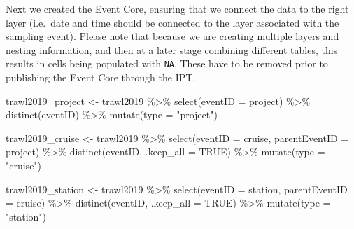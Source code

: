 \documentclass[
]{book}
\newenvironment{Shaded}{\begin{snugshade}}{\end{snugshade}}
\newcommand{\AttributeTok}[1]{\textcolor[rgb]{0.77,0.63,0.00}{#1}}
\newcommand{\ConstantTok}[1]{\textcolor[rgb]{0.00,0.00,0.00}{#1}}
\newcommand{\FunctionTok}[1]{\textcolor[rgb]{0.00,0.00,0.00}{#1}}
\newcommand{\NormalTok}[1]{#1}
\newcommand{\OtherTok}[1]{\textcolor[rgb]{0.56,0.35,0.01}{#1}}
\newcommand{\SpecialCharTok}[1]{\textcolor[rgb]{0.00,0.00,0.00}{#1}}
\newcommand{\StringTok}[1]{\textcolor[rgb]{0.31,0.60,0.02}{#1}}
\begin{document}
Next we created the Event Core, ensuring that we connect the data to the right layer (i.e.~date and time should be connected to the layer associated with the sampling event). Please note that because we are creating multiple layers and nesting information, and then at a later stage combining different tables, this results in cells being populated with \texttt{NA}. These have to be removed prior to publishing the Event Core through the IPT.

\begin{Shaded}
\begin{Highlighting}[]
\NormalTok{trawl2019\_project }\OtherTok{\textless{}{-}}\NormalTok{ trawl2019 }\SpecialCharTok{\%\textgreater{}\%}
  \FunctionTok{select}\NormalTok{(}\AttributeTok{eventID =}\NormalTok{ project) }\SpecialCharTok{\%\textgreater{}\%}
  \FunctionTok{distinct}\NormalTok{(eventID) }\SpecialCharTok{\%\textgreater{}\%}
  \FunctionTok{mutate}\NormalTok{(}\AttributeTok{type =} \StringTok{"project"}\NormalTok{)}

\NormalTok{trawl2019\_cruise }\OtherTok{\textless{}{-}}\NormalTok{ trawl2019 }\SpecialCharTok{\%\textgreater{}\%} 
  \FunctionTok{select}\NormalTok{(}\AttributeTok{eventID =}\NormalTok{ cruise,}
         \AttributeTok{parentEventID =}\NormalTok{ project) }\SpecialCharTok{\%\textgreater{}\%} 
  \FunctionTok{distinct}\NormalTok{(eventID, }\AttributeTok{.keep\_all =} \ConstantTok{TRUE}\NormalTok{) }\SpecialCharTok{\%\textgreater{}\%}
  \FunctionTok{mutate}\NormalTok{(}\AttributeTok{type =} \StringTok{"cruise"}\NormalTok{)}

\NormalTok{trawl2019\_station }\OtherTok{\textless{}{-}}\NormalTok{ trawl2019 }\SpecialCharTok{\%\textgreater{}\%} 
  \FunctionTok{select}\NormalTok{(}\AttributeTok{eventID =}\NormalTok{ station,}
         \AttributeTok{parentEventID =}\NormalTok{ cruise) }\SpecialCharTok{\%\textgreater{}\%} 
  \FunctionTok{distinct}\NormalTok{(eventID, }\AttributeTok{.keep\_all =} \ConstantTok{TRUE}\NormalTok{) }\SpecialCharTok{\%\textgreater{}\%}
  \FunctionTok{mutate}\NormalTok{(}\AttributeTok{type =} \StringTok{"station"}\NormalTok{)}


\end{Highlighting}
\end{Shaded}
\end{document}
